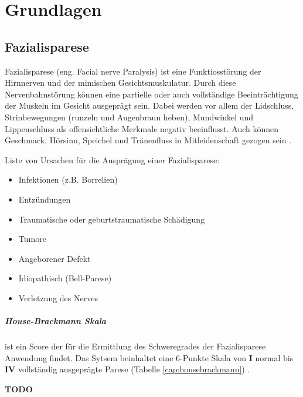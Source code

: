 


\chapter{Grundlagen}\label{basics}
\section{Fazialisparese}\label{facialpalsy}
Fazialisparese (eng. Facial nerve Paralysis) ist eine Funktiosstörung der Hirnnerven und der mimischen Gesichtsmuskulatur. Durch diese Nervenbahnstörung können eine partielle oder auch vollständige Beeinträchtigung der Muskeln im Gesicht ausgeprägt sein. Dabei werden vor allem der Lidschluss, Strinbewegungen (runzeln und Augenbraun heben), Mundwinkel und Lippenschluss als offensichtliche Merkmale negativ beeinflusst. Auch können Geschmack, Hörsinn, Speichel und Tränenfluss in Mitleidenschaft gezogen sein \cite{facialpalsy_1}\cite{facialpalsy_2}.

Liste von Ursachen für die Ausprägung einer Fazialisparese:
\begin{itemize}
  \setlength\itemsep{-0.5em}
\item Infektionen (z.B. Borrelien)
\item Entzündungen
\item Traumatische oder geburtstraumatische
Schädigung
\item Tumore
\item Angeborener Defekt
\item Idiopathisch (Bell-Parese)
\item Verletzung des Nerves
\end{itemize}




\paragraph{House-Brackmann Skala} ist ein Score der für die Ermittlung des Schweregrades der Fazialisparese Anwendung findet. Das Sytsem beinhaltet eine 6-Punkte Skala von \textbf{I} normal bis \textbf{IV} vollständig ausgeprägte Parese (Tabelle \ref{cap:housebrackmann}) \cite{housebrackmann}.

\textbf{TODO}

\vspace{7cm}

